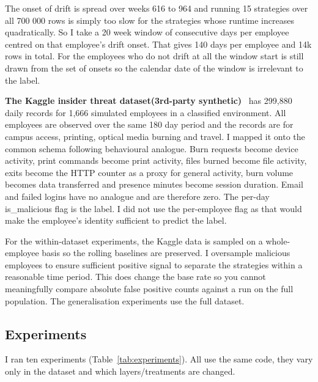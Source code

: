 \documentclass[a4paper,12pt]{article}
\begin{document}
The onset of drift is spread over weeks 616 to 964 and running 15 strategies over all 700 000 rows is simply too slow for the strategies whose runtime increases quadratically. So I take a 20 week window of consecutive days per employee centred on that employee's drift onset. That gives 140 days per employee and 14k rows in total. For the employees who do not drift at all the window start is still drawn from the set of onsets so the calendar date of the window is irrelevant to the label.

\textbf{The Kaggle insider threat dataset(3rd-party synthetic)}~\cite{kaggle_classified2024} has 299,880 daily records for 1,666 simulated employees in a classified environment. All employees are observed over the same 180 day period and the records are for campus access, printing, optical media burning and travel. I mapped it onto the common schema following behavioural analogue. Burn requests become device activity, print commands become print activity, files burned become file activity, exits become the HTTP counter as a proxy for general activity, burn volume becomes data transferred and presence minutes become session duration. Email and failed logins have no analogue and are therefore zero. The per-day is\_malicious flag is the label. I did not use the per-employee flag as that would make the employee's identity sufficient to predict the label.

For the within-dataset experiments, the Kaggle data is sampled on a whole-employee basis so the rolling baselines are preserved. I oversample malicious employees to ensure sufficient positive signal to separate the strategies within a reasonable time period. This does change the base rate so you cannot meaningfully compare absolute false positive counts against a run on the full population. The generalisation experiments use the full dataset.

\subsection{Experiments}
\label{sec:7.2}

I ran ten experiments (Table~\ref{tab:experiments}). All use the same code, they vary only in the dataset and which layers/treatments are changed.
\end{document}

